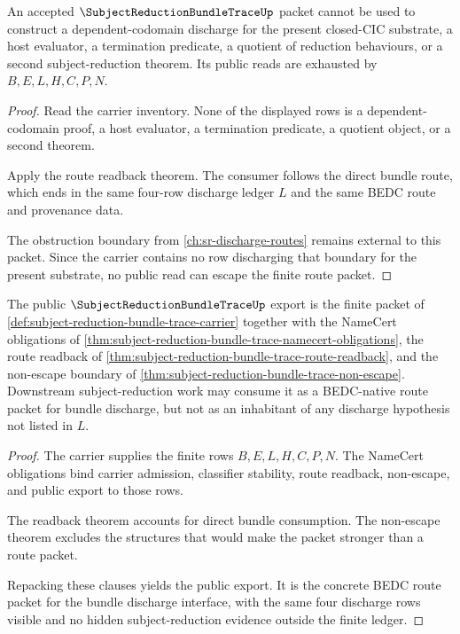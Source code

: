 \begin{theorem}
\label{thm:subject-reduction-bundle-trace-non-escape}
An accepted $\SubjectReductionBundleTraceUp$ packet cannot be used to construct
a dependent-codomain discharge for the present closed-CIC substrate, a host
evaluator, a termination predicate, a quotient of reduction behaviours, or a
second subject-reduction theorem. Its public reads are exhausted by
$B,E,L,H,C,P,N$.
\end{theorem}
\begin{proof}
Read the carrier inventory. None of the displayed rows is a dependent-codomain
proof, a host evaluator, a termination predicate, a quotient object, or a
second theorem.

Apply the route readback theorem. The consumer follows the direct bundle route,
which ends in the same four-row discharge ledger $L$ and the same BEDC route
and provenance data.

The obstruction boundary from \autoref{ch:sr-discharge-routes} remains external
to this packet. Since the carrier contains no row discharging that boundary for
the present substrate, no public read can escape the finite route packet.
\end{proof}

\begin{theorem}
\label{thm:subject-reduction-bundle-trace-public-export}
The public $\SubjectReductionBundleTraceUp$ export is the finite packet of
\autoref{def:subject-reduction-bundle-trace-carrier} together with the NameCert
obligations of \autoref{thm:subject-reduction-bundle-trace-namecert-obligations},
the route readback of
\autoref{thm:subject-reduction-bundle-trace-route-readback}, and the
non-escape boundary of
\autoref{thm:subject-reduction-bundle-trace-non-escape}. Downstream
subject-reduction work may consume it as a BEDC-native route packet for bundle
discharge, but not as an inhabitant of any discharge hypothesis not listed in
$L$.
\end{theorem}
\begin{proof}
The carrier supplies the finite rows $B,E,L,H,C,P,N$. The NameCert obligations
bind carrier admission, classifier stability, route readback, non-escape, and
public export to those rows.

The readback theorem accounts for direct bundle consumption. The non-escape
theorem excludes the structures that would make the packet stronger than a
route packet.

Repacking these clauses yields the public export. It is the concrete BEDC
route packet for the bundle discharge interface, with the same four discharge
rows visible and no hidden subject-reduction evidence outside the finite
ledger.
\end{proof}

